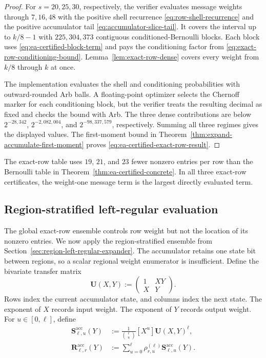 \begin{proof}
For $s=20,25,30$, respectively, the verifier evaluates message weights through
$7,16,48$ with the positive shell recurrence
\eqref{eq:row-shell-recurrence} and the positive accumulator tail
\eqref{eq:accumulator-slice-tail}.  It covers the interval up to $k/8-1$
with $225,304,373$ contiguous conditioned-Bernoulli blocks.  Each block uses
\eqref{eq:ea-certified-block-term} and pays the conditioning factor from
\eqref{eq:exact-row-conditioning-bound}.  Lemma~\ref{lem:exact-row-dense}
covers every weight from $k/8$ through $k$ at once.

The implementation evaluates the shell and conditioning probabilities with
outward-rounded Arb balls.  A floating-point optimizer selects the Chernoff
marker for each conditioning block, but the verifier treats the resulting
decimal as fixed and checks the bound with Arb.  The three dense contributions
are below $2^{-28{,}342}$, $2^{-2{,}082{,}004}$, and
$2^{-98{,}337{,}579}$, respectively.  Summing all three regimes gives the
displayed values.  The first-moment bound in
Theorem~\ref{thm:expand-accumulate-first-moment} proves
\eqref{eq:ea-certified-exact-row-result}.
\end{proof}

The exact-row table uses $19$, $21$, and $23$ fewer nonzero entries per row
than the Bernoulli table in Theorem~\ref{thm:ea-certified-concrete}.  In all
three exact-row certificates, the weight-one message term is the largest
directly evaluated term.

\subsection{Region-stratified left-regular evaluation}
\label{sec:ea-regular-certificate}

The global exact-row ensemble controls row weight but not the location of its
nonzero entries.  We now apply the region-stratified ensemble from
Section~\ref{sec:region-left-regular-expander}.  The accumulator retains one
state bit between regions, so a scalar regional weight enumerator is
insufficient.  Define the bivariate transfer matrix
\begin{equation}
 \mathbf U(X,Y):=
 \begin{pmatrix}
  1&XY\\
  X&Y
 \end{pmatrix}.
 \label{eq:ea-regular-bivariate-matrix}
\end{equation}
Rows index the current accumulator state, and columns index the next state.
The exponent of $X$ records input weight.  The exponent of $Y$ records output
weight.  For $u\in[0,\ell]$, define
\begin{align}
 \mathbf S^{\mathrm{acc}}_{\ell,u}(Y)
 &:=\frac{1}{\binom{\ell}{u}}[X^u]\mathbf U(X,Y)^\ell,
 \label{eq:ea-regular-slice-matrix}\\
 \mathbf R^{\mathrm{acc}}_{\ell,r}(Y)
 &:=\sum_{u=0}^{\ell}\rho^{(\ell)}_{r,u}
      \mathbf S^{\mathrm{acc}}_{\ell,u}(Y).
 \label{eq:ea-regular-region-matrix}
\end{align}

